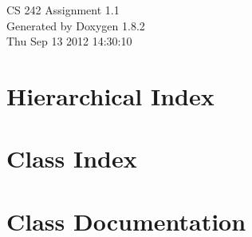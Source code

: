 \documentclass{book}
\begin{document}
\hypersetup{pageanchor=false,citecolor=blue}
\begin{titlepage}
\vspace*{7cm}
\begin{center}
{\Large C\-S 242 Assignment 1.1 }\\
\vspace*{1cm}
{\large Generated by Doxygen 1.8.2}\\
\vspace*{0.5cm}
{\small Thu Sep 13 2012 14:30:10}\\
\end{center}
\end{titlepage}
\clearemptydoublepage
{}
\tableofcontents
\clearemptydoublepage
{}
\hypersetup{pageanchor=true,citecolor=blue}
\chapter{Hierarchical Index}

\chapter{Class Index}

\chapter{Class Documentation}
















\printindex
\end{document}
